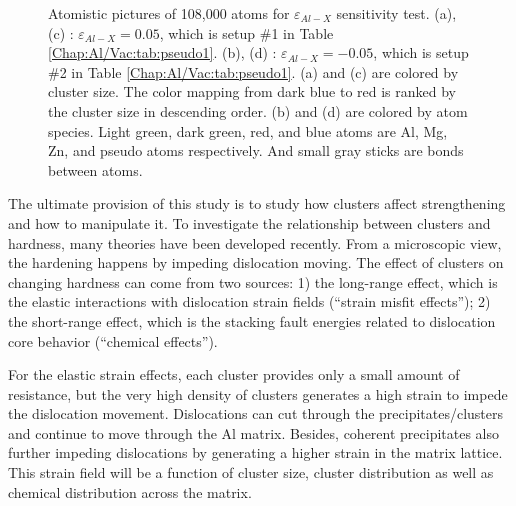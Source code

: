 \begin{figure}[!ht]
\caption[Atomistic pictures of 108,000 atoms for $\varepsilon_{Al-X}$ sensitivity test.]{Atomistic pictures of 108,000 atoms for $\varepsilon_{Al-X}$ sensitivity test. (a), (c) : $\varepsilon_{Al-X} = 0.05$, which is setup \#1 in Table \ref{Chap:Al/Vac:tab:pseudo1}. (b), (d) : $\varepsilon_{Al-X} = -0.05$, which is setup \#2 in Table \ref{Chap:Al/Vac:tab:pseudo1}. (a) and (c) are colored by cluster size. The color mapping from dark blue to red is ranked by the cluster size in descending order. (b) and (d) are colored by atom species. Light green, dark green, red, and blue atoms are Al, Mg, Zn, and pseudo atoms respectively. And small gray sticks are bonds between atoms.}
\label{Chap:Al/Vac:fig:sens_Al}
\end{figure}
\endgroup

The ultimate provision of this study is to study how clusters affect strengthening and how to manipulate it. To investigate the relationship between clusters and hardness, many theories have been developed recently\cite{yasi2010first, starink2009thermodynamics, curtin2006predictive}. From a microscopic view, the hardening happens by impeding dislocation moving. The effect of clusters on changing hardness can come from two sources: 1) the long-range effect, which is the elastic interactions with dislocation strain fields (``strain misfit effects''); 2) the short-range effect, which is the stacking fault energies related to dislocation core behavior (``chemical effects'').

For the elastic strain effects, each cluster provides only a small amount of resistance, but the very high density of clusters generates a high strain to impede the dislocation movement. Dislocations can cut through the precipitates/clusters and continue to move through the Al matrix. Besides, coherent precipitates also further impeding dislocations by generating a higher strain in the matrix lattice. This strain field will be a function of cluster size, cluster distribution as well as chemical distribution across the matrix.

